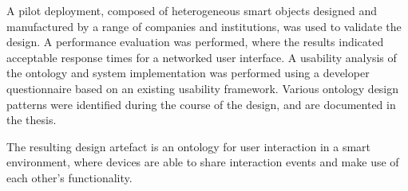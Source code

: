 A pilot deployment, composed of heterogeneous smart objects designed and manufactured by a range of companies and institutions, was used to validate the design. A performance evaluation was performed, where the results indicated acceptable response times for a networked user interface. A usability analysis of the ontology and system implementation was performed using a developer questionnaire based on an existing usability framework. Various ontology design patterns were identified during the course of the design, and are documented in the thesis.

The resulting design artefact is an ontology for user interaction in a smart environment, where devices are able to share interaction events and make use of each other's functionality.